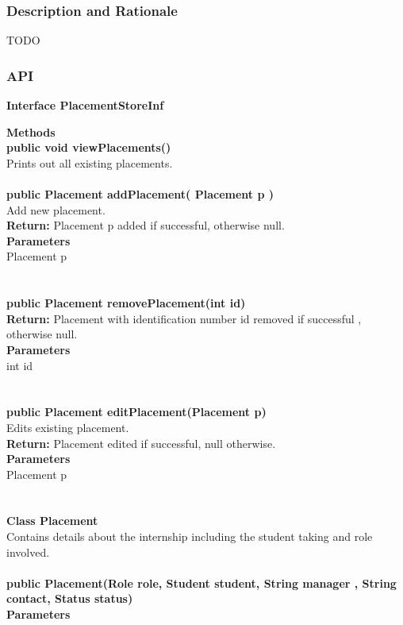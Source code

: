 \documentclass{l3deliverable}
\begin{document}
\subsubsection{Description and Rationale}
TODO
\subsubsection{API}
\textbf{Interface PlacementStoreInf}

\textbf{Methods}\\
\textbf{public void viewPlacements()}\\
Prints out all existing placements.
\\
\\
\textbf{public Placement addPlacement( Placement p )}\\
Add new placement.\\
\textbf{Return: }Placement p added if successful, otherwise null.\\
\textbf{Parameters}\\
Placement p\\
\\
\\
\textbf{public Placement removePlacement(int id)}\\
\textbf{Return: }Placement with identification number id removed if successful , otherwise null.\\
\textbf{Parameters}\\
int id\\
\\
\\
\textbf{public Placement editPlacement(Placement p) }\\
Edits existing placement.\\
\textbf{Return: }Placement edited if successful, null otherwise.\\
\textbf{Parameters}\\
Placement p\\
\\
\\
\textbf{Class Placement}\\
Contains details about the internship including the student taking and role involved.\\
\\
\textbf{public Placement(Role role, Student student, String manager , String contact, Status status)}\\
\textbf{Parameters}\\
\end{document}
